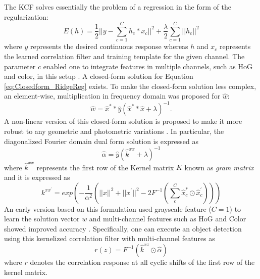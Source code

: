 \documentclass{bmvc2k}
\begin{document}
The KCF solves essentially the problem of a regression in the form of
the regularization:
\begin{equation}
E(h) = \frac{1}{2}||y-\sum_{c=1}^{C}h_{c}*x_{c}||^{2} + \frac{\lambda}{2}\sum_{c=1}^{C}||h_{c}||^{2}
\label{eq:Closedform_RidgeReg}
\end{equation}
where $y$ represents the desired continuous response whereas $h$ and
$x_{c}$ represents the learned correlation filter and training
template for the given channel. The parameter $c$ enabled one to
integrate features in multiple channels, such as HoG and color, in
this setup \cite{henriques2015high,galoogahi2013multi}. A closed-form
solution for Equation \ref{eq:Closedform_RidgeReg} exists. To make the
closed-form solution less complex, an element-wise, multiplication in
frequency domain was proposed for $\hat{w}$:
\begin{equation}
\hat{w} = \hat{x}^{*}*\hat{y}(\hat{x}^{*}*\hat{x}+\lambda)^{-1}.
\label{eq:DiagonalizedPrimalSolution}
\end{equation}
A non-linear version of this closed-form solution is proposed to make
it more robust to any geometric and photometric variations
\cite{henriques2015high}. In particular, the diagonalized Fourier
domain dual form solution is expressed as
\begin{equation}
\hat{\alpha} = \hat{y}(\hat{k}^{xx}+\lambda)^{-1}
\label{eq:FourierDualDomainSolution}
\end{equation}
where $\hat{k}^{xx}$ represents the first row of the Kernel matrix $K$
known as \textit{gram matrix} and it is expressed as
\begin{equation}
k^{xx^{'}} = exp(-\dfrac{1}{\alpha^{2}}(||x||^{2}+||x^{'}||^{2}-2F^{-1}(\sum^{C}_{c}\hat{x}_{c}^{*}\odot \hat{x}_{c}^{'})))
\label{eq:GaussianCorrelationSingleChannel}
\end{equation}
An early version based on this formulation used grayscale feature
($C=1$) to learn the solution vector $w$ and multi-channel features
such as HoG and Color showed improved accuracy
\cite{henriques2015high,galoogahi2013multi,tang2015multi,ma2015long,bibi2015multi}. Specifically,
one can execute an object detection using this kernelized correlation
filter with multi-channel features as 
\begin{equation}
r(z) = F^{-1}(\hat{k}^{xz} \odot \hat{\alpha})
\end{equation}
where $r$ denotes the correlation response at all cyclic shifts of the
first row of the kernel matrix.
\end{document}
